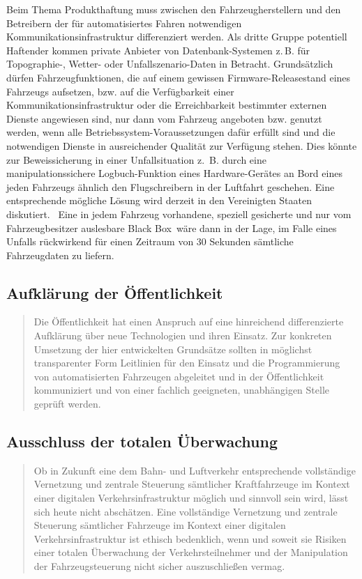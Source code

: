 \documentclass[twoside,a4paper,12pt]{article}
\begin{document}
Beim Thema Produkthaftung muss zwischen den Fahrzeugherstellern und den Betreibern der für automatisiertes Fahren notwendigen
Kommunikationsinfrastruktur differenziert werden. Als dritte Gruppe potentiell Haftender kommen private Anbieter von Datenbank-Systemen z.\,B. für 
Topographie-, Wetter- oder Unfallszenario-Daten in Betracht. Grundsätzlich dürfen Fahrzeugfunktionen, die auf einem gewissen Firmware-Releasestand
eines Fahrzeugs aufsetzen, bzw. auf die Verfügbarkeit einer Kommunikationsinfrastruktur oder die Erreichbarkeit bestimmter externen Dienste
angewiesen sind, nur dann vom Fahrzeug angeboten bzw. genutzt werden, wenn alle \glqq Betriebssystem\grqq -Voraussetzungen dafür erfüllt sind 
und die notwendigen Dienste in ausreichender Qualität zur Verfügung stehen. Dies könnte zur Beweissicherung in einer Unfallsituation
z.\, B. durch eine manipulationssichere Logbuch-Funktion eines Hardware-Gerätes an Bord eines jeden Fahrzeugs ähnlich den Flugschreibern in der Luftfahrt
geschehen. Eine entsprechende mögliche Lösung wird derzeit in den Vereinigten Staaten diskutiert.~\cite{epic} Eine in jedem Fahrzeug vorhandene, speziell 
gesicherte und nur vom Fahrzeugbesitzer auslesbare \glqq Black Box\grqq\ wäre dann in der Lage, im Falle eines Unfalls rückwirkend für einen Zeitraum 
von 30 Sekunden sämtliche Fahrzeugdaten zu liefern.

\subsection{Aufklärung der Öffentlichkeit} \label{AufklaerungDerOeffentlichkeit}

\begin{quote}
\glqq
Die Öffentlichkeit hat einen Anspruch auf eine hinreichend differenzierte Aufklärung
über neue Technologien und ihren Einsatz. Zur konkreten Umsetzung der hier entwickelten Grundsätze sollten in möglichst 
transparenter Form Leitlinien für den Einsatz und die
Programmierung von automatisierten Fahrzeugen abgeleitet und in der Öffentlichkeit
kommuniziert und von einer fachlich geeigneten, unabhängigen Stelle geprüft werden.\grqq\mbox{~\cite[S. 12]{ek}}
\end{quote}

\subsection{Ausschluss der totalen Überwachung} \label{AusschlussDerTotalenUeberwachung}

\begin{quote}
\glqq
Ob in Zukunft eine dem Bahn- und Luftverkehr entsprechende vollständige Vernetzung
und zentrale Steuerung sämtlicher Kraftfahrzeuge im Kontext einer digitalen Verkehrsinfrastruktur möglich und sinnvoll sein wird, 
lässt sich heute nicht abschätzen. Eine vollständige Vernetzung und zentrale Steuerung sämtlicher Fahrzeuge im Kontext einer 
digitalen Verkehrsinfrastruktur ist ethisch bedenklich, wenn und soweit sie Risiken einer totalen Überwachung der Verkehrsteilnehmer 
und der Manipulation der Fahrzeugsteuerung nicht sicher auszuschließen vermag.\grqq\mbox{~\cite[S. 12]{ek}}
\end{quote}
\end{document}
